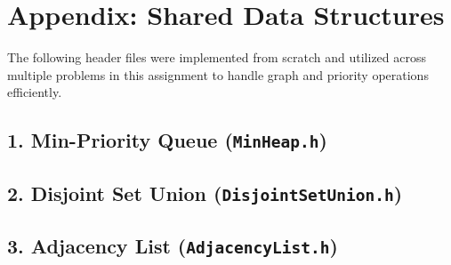 \documentclass[a4paper,12pt]{article}
\begin{document}
\newpage

\section*{Appendix: Shared Data Structures}
The following header files were implemented from scratch and utilized across multiple problems in this assignment to handle graph and priority operations efficiently.

\vspace{0.5cm}

\hypertarget{target:minheap}{} 
\subsection*{1. Min-Priority Queue (\texttt{MinHeap.h})}
 

\vspace{1cm}

\newpage

\hypertarget{target:dsu}{} 
\subsection*{2. Disjoint Set Union (\texttt{DisjointSetUnion.h})}
 

\vspace{1cm}

\newpage
\hypertarget{target:adjlist}{} 
\subsection*{3. Adjacency List (\texttt{AdjacencyList.h})}
\end{document}
